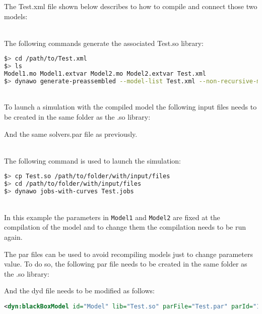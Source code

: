 \documentclass[a4paper, 12pt]{report}
\begin{document}
The Test.xml file shown below describes to \Dynawo how to compile and connect those two models:


~~\\
The following commands generate the associated Test.so library:
\begin{lstlisting}[language=bash,deletekeywords={jobs,help}]
$> cd /path/to/Test.xml
$> ls
Model1.mo Model1.extvar Model2.mo Model2.extvar Test.xml
$> dynawo generate-preassembled --model-list Test.xml --non-recursive-modelica-models-dir .
\end{lstlisting}

~~\\
To launch a simulation with the compiled model the following input files needs to be created in the same folder as the .so library:



And the same solvers.par file as previously.

~~\\
The following command is used to launch the simulation:
\begin{lstlisting}[language=bash,deletekeywords={jobs,help}]
$> cp Test.so /path/to/folder/with/input/files
$> cd /path/to/folder/with/input/files
$> dynawo jobs-with-curves Test.jobs
\end{lstlisting}

~~\\
In this example the parameters in \lstinline[language=Modelica]{Model1} and \lstinline[language=Modelica]{Model2} are fixed at the compilation of the model and to change them the compilation needs to be run again.

The \Dynawo par files can be used to avoid recompiling models just to change parameters value. To do so, the following par file needs to be created in the same folder as the .so library:


And the dyd file needs to be modified as follows:
\begin{lstlisting}[language=XML]
<dyn:blackBoxModel id="Model" lib="Test.so" parFile="Test.par" parId="1"/>
\end{lstlisting}
\end{document}

